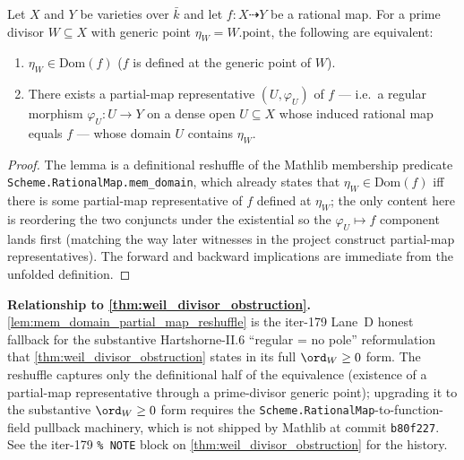 \begin{lemma}


  \label{lem:mem_domain_partial_map_reshuffle}
  Let \(X\) and \(Y\) be varieties over \(\bar k\) and let
  \(f \colon X \dashrightarrow Y\) be a rational map. For a prime divisor
  \(W \subseteq X\) with generic point \(\eta_W = W.\mathrm{point}\), the
  following are equivalent:
  \begin{enumerate}
    \item \(\eta_W \in \mathrm{Dom}(f)\) (\(f\) is defined at the generic point of
      \(W\)).
    \item There exists a partial-map representative \((U, \varphi_U)\) of \(f\) ---
      i.e.\ a regular morphism \(\varphi_U \colon U \to Y\) on a dense open
      \(U \subseteq X\) whose induced rational map equals \(f\) --- whose domain
      \(U\) contains \(\eta_W\).
  \end{enumerate}
\end{lemma}

\begin{proof}

  The lemma is a definitional reshuffle of the Mathlib membership predicate
  \texttt{Scheme.RationalMap.mem\_domain}, which already states that
  \(\eta_W \in \mathrm{Dom}(f)\) iff there is some partial-map representative of
  \(f\) defined at \(\eta_W\); the only content here is reordering the two
  conjuncts under the existential so the \(\varphi_U \mapsto f\) component lands
  first (matching the way later witnesses in the project construct partial-map
  representatives). The forward and backward implications are immediate from
  the unfolded definition.
\end{proof}

\begin{remark}
  \label{rmk:mem_domain_partial_map_reshuffle_scope}
  \textbf{Relationship to \cref{thm:weil_divisor_obstruction}.}
  \cref{lem:mem_domain_partial_map_reshuffle} is the iter-179 Lane~D honest
  fallback for the substantive Hartshorne-II.6 ``regular = no pole''
  reformulation that \cref{thm:weil_divisor_obstruction} states in its full
  \(\ord_W \geq 0\) form. The reshuffle captures only the
  definitional half of the equivalence (existence of a partial-map
  representative through a prime-divisor generic point); upgrading it to the
  substantive \(\ord_W \geq 0\) form requires the
  \texttt{Scheme.RationalMap}-to-function-field pullback machinery, which is
  not shipped by Mathlib at commit \texttt{b80f227}. See the iter-179
  \texttt{\% NOTE} block on \cref{thm:weil_divisor_obstruction} for the
  history.
\end{remark}


